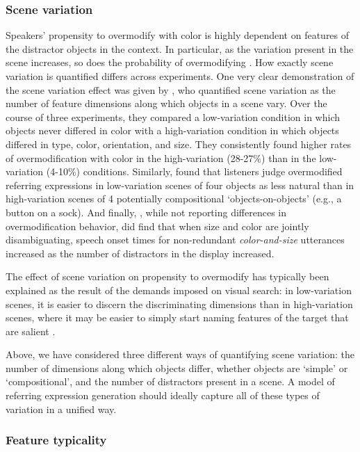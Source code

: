 \documentclass[11pt]{article}
\begin{document}
\subsubsection{Scene variation}
\label{sec:scenevariation}

Speakers' propensity to overmodify with color is highly dependent on features of the distractor objects in the context. In particular, as the variation present in the scene increases, so does the probability of overmodifying  \cite{Davies2013, Koolen2013}. How exactly scene variation is quantified differs across experiments. One very clear demonstration of the scene variation effect was given by , who quantified scene variation as the number of feature dimensions along which objects in a scene vary. Over the course of three experiments, they compared a low-variation condition in which objects never differed in color with a high-variation condition in which objects differed in type, color, orientation, and size. They consistently found higher rates of overmodification with color in the high-variation (28-27\%) than in the low-variation (4-10\%) conditions. Similarly,  found that listeners judge overmodified referring expressions in low-variation scenes of four objects as less natural than in high-variation scenes of 4 potentially compositional `objects-on-objects' (e.g., a button on a sock). And finally, , while not reporting differences in overmodification behavior, did find that when size and color are jointly disambiguating, speech onset times for non-redundant \emph{color-and-size} utterances increased as the number of distractors in the display increased.

The effect of scene variation on propensity to overmodify has typically been explained as the result of the demands imposed on visual search: in low-variation scenes, it is easier to discern the discriminating dimensions than in high-variation scenes, where it may be easier to simply start naming features of the target that are salient \cite{Koolen2013}. 


Above, we have considered three different ways of quantifying scene variation: the number of dimensions along which objects differ, whether objects are `simple' or `compositional', and the number of distractors present in a scene. A model of referring expression generation should ideally capture all of these types of variation in a unified way. 



\subsubsection{Feature typicality}
\label{sec:colortypicalityintro}
\end{document}
